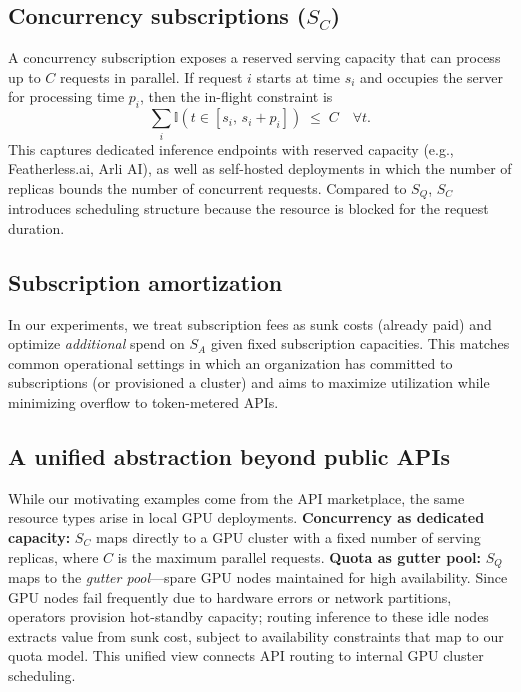 \subsection{Concurrency subscriptions ($S_C$)}
\label{sec:sc}
A concurrency subscription exposes a reserved serving capacity that can process up to $C$ requests in parallel.
If request $i$ starts at time $s_i$ and occupies the server for processing time $p_i$, then the in-flight constraint is
\[
\sum_i \mathbb{I}\!\left(t \in [s_i,\, s_i+p_i]\right) \;\le\; C \quad \forall t.
\]
This captures dedicated inference endpoints with reserved capacity (e.g., Featherless.ai, Arli AI),\cite{featherless-plans,arli-pricing}
as well as self-hosted deployments in which the number of replicas bounds the number of concurrent requests.\cite{vllm_pagedattention}
Compared to $S_Q$, $S_C$ introduces scheduling structure because the resource is blocked for the request duration.

\subsection{Subscription amortization}
\label{sec:amortization}
In our experiments, we treat subscription fees as sunk costs (already paid) and optimize \emph{additional} spend on $S_A$ given fixed subscription capacities.
This matches common operational settings in which an organization has committed to subscriptions (or provisioned a cluster) and aims to maximize utilization while minimizing overflow to token-metered APIs.

\subsection{A unified abstraction beyond public APIs}
While our motivating examples come from the API marketplace, the same resource types arise in local GPU deployments.
\textbf{Concurrency as dedicated capacity:} $S_C$ maps directly to a GPU cluster with a fixed number of serving replicas, where $C$ is the maximum parallel requests.\cite{vllm_pagedattention}
\textbf{Quota as gutter pool:} $S_Q$ maps to the \textit{gutter pool}---spare GPU nodes maintained for high availability.\cite{sre_introduction_goog}
Since GPU nodes fail frequently due to hardware errors or network partitions,\cite{kokolis_reliability_2024} operators provision hot-standby capacity; routing inference to these idle nodes extracts value from sunk cost, subject to availability constraints that map to our quota model.
This unified view connects API routing to internal GPU cluster scheduling.

